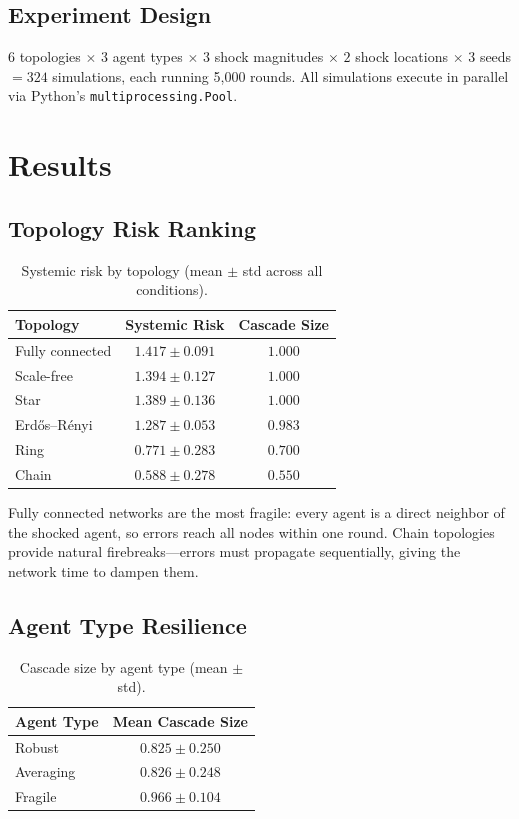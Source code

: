 \documentclass[11pt]{article}
\begin{document}
\subsection{Experiment Design}

$6$ topologies $\times$ $3$ agent types $\times$ $3$ shock magnitudes $\times$ $2$ shock locations $\times$ $3$ seeds $= 324$ simulations, each running 5{,}000 rounds.
All simulations execute in parallel via Python's \texttt{multiprocessing.Pool}.

\section{Results}

\subsection{Topology Risk Ranking}

\begin{table}[h]
\centering
\caption{Systemic risk by topology (mean $\pm$ std across all conditions).}
\label{tab:topology}
\begin{tabular}{lcc}
\toprule
Topology & Systemic Risk & Cascade Size \\
\midrule
Fully connected & $1.417 \pm 0.091$ & $1.000$ \\
Scale-free       & $1.394 \pm 0.127$ & $1.000$ \\
Star             & $1.389 \pm 0.136$ & $1.000$ \\
Erd\H{o}s--R\'{e}nyi & $1.287 \pm 0.053$ & $0.983$ \\
Ring             & $0.771 \pm 0.283$ & $0.700$ \\
Chain            & $0.588 \pm 0.278$ & $0.550$ \\
\bottomrule
\end{tabular}
\end{table}

Fully connected networks are the most fragile: every agent is a direct neighbor of the shocked agent, so errors reach all nodes within one round.
Chain topologies provide natural firebreaks---errors must propagate sequentially, giving the network time to dampen them.

\subsection{Agent Type Resilience}

\begin{table}[h]
\centering
\caption{Cascade size by agent type (mean $\pm$ std).}
\label{tab:agents}
\begin{tabular}{lc}
\toprule
Agent Type & Mean Cascade Size \\
\midrule
Robust    & $0.825 \pm 0.250$ \\
Averaging & $0.826 \pm 0.248$ \\
Fragile   & $0.966 \pm 0.104$ \\
\bottomrule
\end{tabular}
\end{table}
\end{document}
